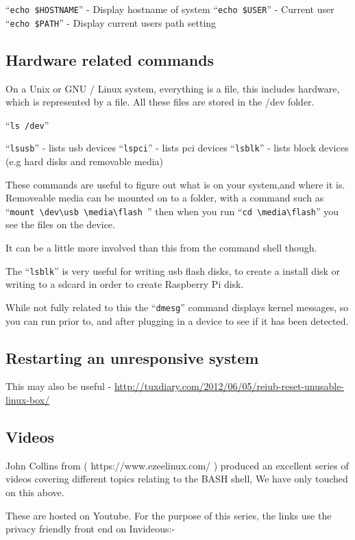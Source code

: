 \documentclass{extbook}
\begin{document}
``\verb|echo $HOSTNAME|'' - Display hostname of system
``\verb|echo $USER|'' - Current user
``\verb|echo $PATH|'' - Display current users path setting

\subsection{Hardware related commands}

On a Unix or GNU / Linux system, everything is a file,  this includes hardware, which is represented by a file. All these files are stored in the /dev folder.

``\verb|ls /dev|''

``\verb|lsusb|'' - lists usb devices
``\verb|lspci|'' - lists pci devices
``\verb|lsblk|'' - lists block devices (e.g hard disks and removable media)

These commands are useful to figure out what is on your system,and where it is.  Removeable media can be mounted on to a folder, with a command such as ``\verb|mount \dev\usb \media\flash |''  then when you run ``\verb|cd \media\flash|'' you see the files on the device.

It can be a little more involved than this from the command shell though. 

The ``\verb|lsblk|'' is very useful for writing usb flash disks, to create a install disk or writing to a sdcard in order to create Raspberry Pi disk.

While not fully related to this the ``\verb|dmesg|'' command displays kernel messages,  so you can run prior to, and after plugging in a device to see if it has been detected. 
 
\subsection{Restarting an unresponsive system}

This may also be useful - \url{http://tuxdiary.com/2012/06/05/reiub-reset-unusable-linux-box/}

\subsection{Videos}

John Collins from ( https://www.ezeelinux.com/ ) produced an excellent series of videos covering different topics relating to the BASH shell,  We have only touched on this above.

These are hosted on Youtube.  For the purpose of this series, the links use the privacy friendly front end on Invideous:-
\end{document}
